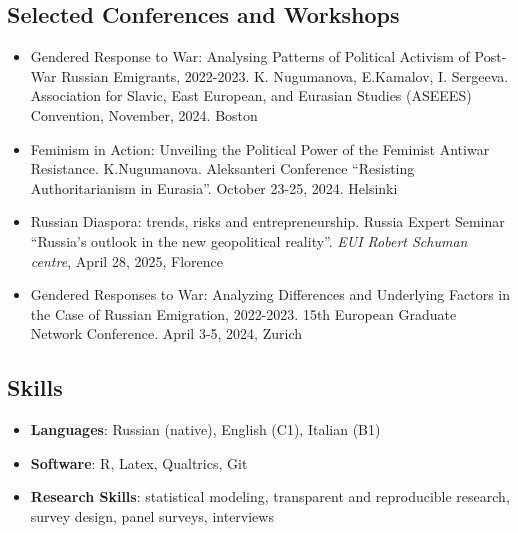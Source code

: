 \documentclass[
]{article}
\providecommand{\tightlist}{%
  \setlength{\itemsep}{0pt}\setlength{\parskip}{0pt}}
\begin{document}
\hypertarget{selected-conferences-and-workshops}{%
\subsection{Selected Conferences and
Workshops}\label{selected-conferences-and-workshops}}

\begin{itemize}
\tightlist
\item
  Gendered Response to War: Analysing Patterns of Political Activism of
  Post-War Russian Emigrants, 2022-2023. K. Nugumanova, E.Kamalov, I.
  Sergeeva. Association for Slavic, East European, and Eurasian Studies
  (ASEEES) Convention, November, 2024. Boston
\item
  Feminism in Action: Unveiling the Political Power of the Feminist
  Antiwar Resistance. K.Nugumanova. Aleksanteri Conference ``Resisting
  Authoritarianism in Eurasia''. October 23-25, 2024. Helsinki
\item
  Russian Diaspora: trends, risks and entrepreneurship. Russia Expert
  Seminar ``Russia's outlook in the new geopolitical reality''.
  \emph{EUI Robert Schuman centre}, April 28, 2025, Florence
\item
  Gendered Responses to War: Analyzing Differences and Underlying
  Factors in the Case of Russian Emigration, 2022-2023. 15th European
  Graduate Network Conference. April 3-5, 2024, Zurich
\end{itemize}

\hypertarget{skills}{%
\subsection{Skills}\label{skills}}

\begin{itemize}
\item
  \textbf{Languages}: Russian (native), English (C1), Italian (B1)
\item
  \textbf{Software}: R, Latex, Qualtrics, Git
\item
  \textbf{Research Skills}: statistical modeling, transparent and
  reproducible research, survey design, panel surveys, interviews
\end{itemize}
\end{document}
